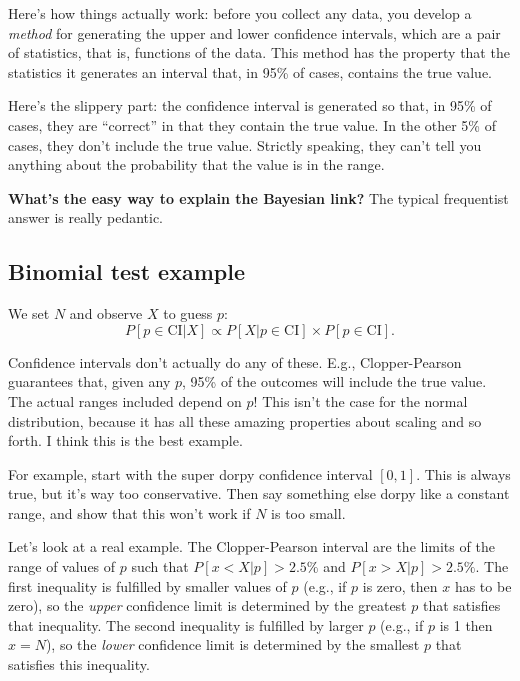 \documentclass{book}
\begin{document}
Here's how things actually work: before you collect any data, you
develop a \emph{method} for generating the upper and lower confidence
intervals, which are a pair of statistics, that is, functions of the
data. This method has the property that the statistics it generates an
interval that, in 95\% of cases, contains the true value.

Here's the slippery part: the confidence interval is generated so that,
in 95\% of cases, they are ``correct'' in that they contain the true
value. In the other 5\% of cases, they don't include the true value.
Strictly speaking, they can't tell you anything about the probability
that the value is in the range.

\textbf{What's the easy way to explain the Bayesian link?} The typical
frequentist answer is really pedantic.

\subsection{Binomial test example}\label{binomial-test-example}

We set \(N\) and observe \(X\) to guess \(p\): \[
P[p \in \mathrm{CI} | X] \propto P[X | p \in \mathrm{CI}] \times P[p \in \mathrm{CI}].
\]

Confidence intervals don't actually do any of these. E.g.,
Clopper-Pearson guarantees that, given any \(p\), 95\% of the outcomes
will include the true value. The actual ranges included depend on \(p\)!
This isn't the case for the normal distribution, because it has all
these amazing properties about scaling and so forth. I think this is the
best example.

For example, start with the super dorpy confidence interval \([0, 1]\).
This is always true, but it's way too conservative. Then say something
else dorpy like a constant range, and show that this won't work if \(N\)
is too small.

Let's look at a real example. The Clopper-Pearson interval are the
limits of the range of values of \(p\) such that
\(P[x < X | p] > 2.5\%\) and \(P[x > X | p] > 2.5\%\). The first
inequality is fulfilled by smaller values of \(p\) (e.g., if \(p\) is
zero, then \(x\) has to be zero), so the \emph{upper} confidence limit
is determined by the greatest \(p\) that satisfies that inequality. The
second inequality is fulfilled by larger \(p\) (e.g., if \(p\) is 1 then
\(x=N\)), so the \emph{lower} confidence limit is determined by the
smallest \(p\) that satisfies this inequality.
\end{document}
